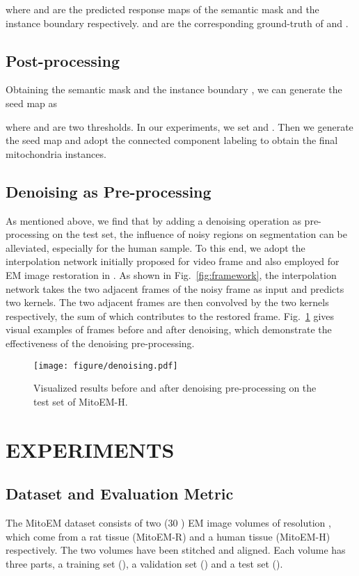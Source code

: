 \documentclass{article}
\begin{document}
where  and  are the predicted response maps of the semantic mask and the instance boundary respectively.  and  are the corresponding ground-truth of  and .

\subsection{Post-processing}
Obtaining the semantic mask  and the instance boundary , we can generate the seed map  as 

where  and  are two thresholds. In our experiments, we set  and . Then we generate the seed map and adopt the connected component labeling   to obtain the final mitochondria instances.

\subsection{Denoising as Pre-processing}
As mentioned above, we find that by adding a denoising operation as pre-processing on the test set, the influence of noisy regions on segmentation can be alleviated, especially for the human sample.  To this end, we adopt the interpolation network initially proposed for video frame \cite{niklaus2017video} and also employed for EM image restoration in \cite{huang2020learning}. As shown in Fig.~\ref{fig:framework}, the interpolation network takes the two adjacent frames of the noisy frame as input and predicts two kernels. The two adjacent frames are then convolved by the two kernels respectively, the sum of which contributes to the restored frame. Fig.~\ref{fig:Denosing}  gives visual examples of frames before and after denoising, which demonstrate the effectiveness of the denoising pre-processing.





\begin{figure}[t]
	\centering
	\texttt{[image: figure/denoising.pdf]} \caption{Visualized results before and after denoising pre-processing on the test set of MitoEM-H.} \label{fig:Denosing}
\end{figure}

\vspace{-0.3cm}
\section{EXPERIMENTS}
\label{sec:exp}
\subsection{Dataset and Evaluation Metric}
The MitoEM dataset \cite{wei2020mitoem} consists of two (30 ) EM image volumes of resolution  , which come from a rat tissue (MitoEM-R) and a human tissue (MitoEM-H) respectively. The two volumes have been stitched and aligned. Each volume has three parts, a training set (), a validation set () and a test set ().
\end{document}
